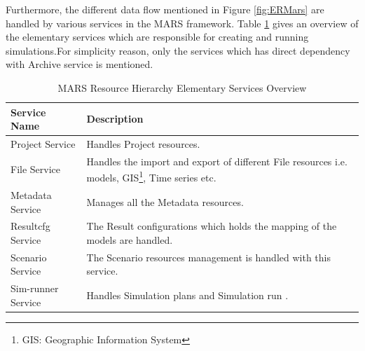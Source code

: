         Furthermore, the different data flow mentioned in Figure \ref{fig:ERMars} are handled by various services in the MARS framework. 
        Table \ref{table:MARS Resource Hierarchy Service Overview} gives an overview of the elementary services which are responsible for 
        creating and running simulations.For simplicity reason, only the services
        which has direct dependency with Archive service is mentioned.
        \begin{table}[h!]
            \centering
            \begin{tabular}{|p{4cm}|p{11cm}|}
                \hline
                    \textbf{Service Name}  & \textbf{Description}\\
                \hline
                    Project Service & 
                    Handles Project resources. \\
                \hline
                    File Service
                    & Handles the import and export of different File resources i.e. models, GIS\footnote{\label{footnote:GIS}GIS: Geographic Information System}, 
                    Time series etc.\\
                \hline
                    Metadata Service  & Manages all the Metadata resources.\\
                \hline
                    Resultcfg Service  & The Result configurations which holds the mapping of the models are handled.\\
                \hline
                    Scenario Service  & The Scenario resources management is handled with this service.\\
                \hline
                    Sim-runner Service  & Handles Simulation plans and Simulation run .\\
                \hline
            \end{tabular}
            \caption{MARS Resource Hierarchy Elementary Services Overview}
            \label{table:MARS Resource Hierarchy Service Overview}     
        \end{table}    